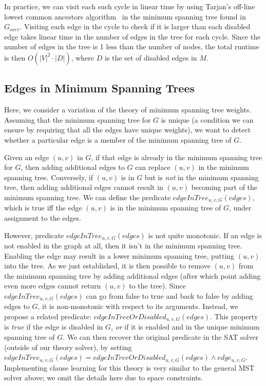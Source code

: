 \documentclass[runningheads]{llncs}
\newcommand{\gover}{G_{over}}
\begin{document}
\begin{description}
\begin{enumerate}
In practice, we can visit each such cycle in linear time by using Tarjan's off-line lowest common ancestors algorithm~\cite{gabow1985linear} in the minimum spanning tree found in $\gover$. Visiting each edge in the cycle to check if it is larger than each disabled edge takes linear time in the number of edges in the tree for each cycle. Since the number of edges in the tree is 1 less than the number of nodes, the total runtime is then $O(|V|^2\cdot |D|)$, where $D$ is the set of disabled edges in $M$.
\end{enumerate}
\end{description}

\subsection{{Edges in Minimum Spanning Trees}}
Here, we consider a variation of the theory of minimum spanning tree weights.
Assuming that the minimum spanning tree for $G$ is unique (a
condition we can ensure by requiring that all the edges have unique
weights), 
we want to detect whether a particular edge is a member of the minimum spanning tree of $G$. 

Given an edge $(u,v)$ in $G$, if that edge is already in the minimum
spanning tree for $G$, then adding additional edges to $G$ can replace
$(u,v)$ in the minimum spanning tree. Conversely, if $(u,v)$ is in $G$
but is \textit{not} in the minimum spanning tree, then adding additional
edges cannot result in $(u,v)$ becoming part of the minimum spanning
tree.
We can define the predicate $edgeInTree_{u,v,G}(edges)$,
which is true iff the edge $(u,v)$ is in the minimum spanning tree of $G$, under assignment to the edges.

However, predicate $edgeInTree_{u,v,G}(edges)$ is not quite monotonic. If an edge is not enabled in the graph at all, then it isn't in the minimum spanning tree. Enabling the edge may result in a lower minimum spanning tree, putting $(u,v)$ into the tree. As we just established, it is then possible to remove $(u,v)$ from the minimum spanning tree by adding additional edges (after which point adding even more edges cannot return $(u,v)$ to the tree). Since  $edgeInTree_{u,v,G}(edges)$ can go from false to true and back to false by adding edges to $G$, it is non-monotonic with respect to its arguments. Instead, we propose a related predicate: $edgeInTreeOrDisabled_{u,v,G}(edges)$. This property is \textit{true} if the edge is disabled in $G$, \textit{or} if it is enabled and in the unique minimum spanning tree of $G$. We can then recover the original predicate in the SAT solver (outside of our theory solver), by setting $edgeInTree_{u,v,G}(edges) = edgeInTreeOrDisabled_{u,v,G}(edges) \land edge_{u,v,G}$. Implementing clause learning for this theory is very similar to the general MST solver above; we omit the details here due to space constraints.
\end{document}

